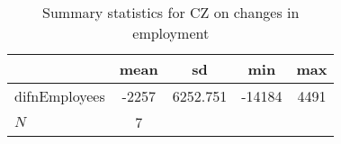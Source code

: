 \begin{table}[htbp]\centering
\def\sym#1{\ifmmode^{#1}\else\(^{#1}\)\fi}
\caption{Summary statistics for CZ on changes in employment}
\begin{tabular}{l*{1}{cccc}}
\hline\hline
            &        mean&          sd&         min&         max\\
\hline
difnEmployees&       -2257&    6252.751&      -14184&        4491\\
\hline
\(N\)       &           7&            &            &            \\
\hline\hline
\end{tabular}
\end{table}
